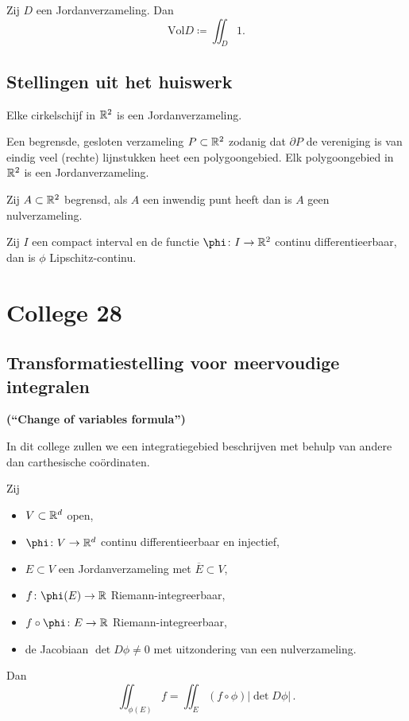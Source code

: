 \documentclass{2wa40summary}
\begin{document}
	    \begin{define}
	    	Zij $D$ een Jordanverzameling. Dan
	    	\[ 
		    	\text{Vol}D \coloneqq  \iint_D 1.
	    	 \]
	    \end{define}
	    
	    \subsection{Stellingen uit het huiswerk}
	    
	    \begin{theorem}
	    	Elke cirkelschijf in $\mathbb{R}^2$ is een Jordanverzameling.
	    \end{theorem}
	    \begin{theorem}
	    	Een begrensde, gesloten verzameling $P \subset \mathbb{R}^2$ zodanig dat $\partial P$ de vereniging is van eindig veel (rechte) lijnstukken heet een polygoongebied.  
	    	Elk polygoongebied in $\mathbb{R}^2$ is een Jordanverzameling.
	    \end{theorem}
	    \begin{theorem}
	    	Zij $A \subset \mathbb{R}^2$ begrensd, als $A$ een inwendig punt heeft dan is $A$ geen nulverzameling.
	    \end{theorem}
	    \begin{theorem}
	    	Zij $I$ een compact interval en de functie $\phi \: I \to \reals^2$ continu differentieerbaar, dan is $\phi$ Lipschitz-continu.
	    \end{theorem}
	    
	    \newpage
	    \section{College 28}
	    \subsection{Transformatiestelling voor meervoudige integralen}
	    \textbf{(``Change of variables formula'')}
	    
	    In dit college zullen we een integratiegebied beschrijven met behulp van andere dan carthesische co\"ordinaten.
	    
	    \begin{theorem}
	    	Zij 
	    	\begin{itemize}
		    	\item $V \subset \mathbb{R}^d$ open,
		    	\item $\phi \: V \to \reals^d$ continu differentieerbaar en injectief,
		    	\item $E \subset V$ een Jordanverzameling met $\overline{E} \subset V$,
		    	\item $f \: \phi(E) \to \reals$ Riemann-integreerbaar,
		    	\item $f \circ \phi \: E \to \reals$ Riemann-integreerbaar,
		    	\item de Jacobiaan $\det D\phi \neq 0$ met uitzondering van een nulverzameling.
	    	\end{itemize}
	    	Dan 
	    	\[ 
		    	\iint_{\phi(E)} f = \iint_E (f \circ \phi) |\det D\phi| \,.
	    	 \]
	    \end{theorem}
	    
\end{document}
